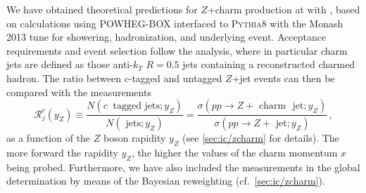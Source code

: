 We have obtained  theoretical predictions for $Z$+charm production at \lhcb
with , based on \nlo \qcd calculations using \textsc{\small
POWHEG-BOX}  interfaced to \textsc{\small Pythia8} with the Monash 2013 tune
for showering, hadronization, and underlying event.
%
Acceptance requirements and event selection follow the \lhcb analysis,
where in particular charm jets are defined as those anti-$k_T$ $R=0.5$ jets
containing a reconstructed charmed hadron.
%
The ratio between $c$-tagged and untagged $Z$+jet events can then be compared
with the \lhcb measurements
\begin{equation}
  \mathcal{R}_j^c(y_Z) \equiv \frac{N(c~\textrm{ tagged~jets};y_Z)}{ 
    N(\textrm{ jets};y_Z)} =
  \frac{\sigma(pp\to Z+\textrm{ charm~ jet};y_Z)}{\sigma(pp \to Z+\textrm{ jet};y_Z)} \, ,
\end{equation}
as a function of the $Z$ boson rapidity $y_Z$ (see \cref{sec:ic/zcharm} for
details).
%
The more forward the rapidity $y_{Z}$, the higher the values of the charm
momentum $x$ being probed.
%
Furthermore, we have also included the \lhcb measurements in the global \pdf
determination by means of the Bayesian reweighting (cf.\ \cref{sec:ic/zcharm}).
